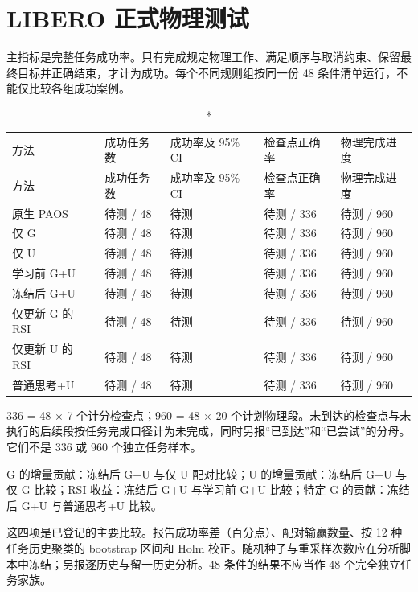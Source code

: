 \documentclass[UTF8,10pt,a4paper]{ctexart}
\begin{document}
\section*{LIBERO 正式物理测试}
主指标是完整任务成功率。只有完成规定物理工作、满足顺序与取消约束、保留最终目标并正确结束，才计为成功。每个不同规则组按同一份 48 条件清单运行，不能仅比较各组成功案例。
\begin{small}
\begin{longtable}{>{\raggedright\arraybackslash}p{3.73cm}>{\raggedright\arraybackslash}p{2.41cm}>{\raggedright\arraybackslash}p{3.51cm}>{\raggedright\arraybackslash}p{2.85cm}>{\raggedright\arraybackslash}p{2.63cm}}
\caption*{表 4 LIBERO 正式测试主结果预留表}\\
\toprule
方法 & 成功任务数 & 成功率及 95\% CI & 检查点正确率 & 物理完成进度\\\midrule
\endfirsthead
\toprule
方法 & 成功任务数 & 成功率及 95\% CI & 检查点正确率 & 物理完成进度\\\midrule
\endhead
原生 PAOS & 待测 / 48 & 待测 & 待测 / 336 & 待测 / 960\\
仅 G & 待测 / 48 & 待测 & 待测 / 336 & 待测 / 960\\
仅 U & 待测 / 48 & 待测 & 待测 / 336 & 待测 / 960\\
学习前 G+U & 待测 / 48 & 待测 & 待测 / 336 & 待测 / 960\\
冻结后 G+U & 待测 / 48 & 待测 & 待测 / 336 & 待测 / 960\\
仅更新 G 的 RSI & 待测 / 48 & 待测 & 待测 / 336 & 待测 / 960\\
仅更新 U 的 RSI & 待测 / 48 & 待测 & 待测 / 336 & 待测 / 960\\
普通思考+U & 待测 / 48 & 待测 & 待测 / 336 & 待测 / 960\\
\bottomrule
\end{longtable}
\end{small}
336 = 48 \ensuremath{\times} 7 个计分检查点；960 = 48 \ensuremath{\times} 20 个计划物理段。未到达的检查点与未执行的后续段按任务完成口径计为未完成，同时另报“已到达”和“已尝试”的分母。它们不是 336 或 960 个独立任务样本。

G 的增量贡献：冻结后 G+U 与仅 U 配对比较；U 的增量贡献：冻结后 G+U 与仅 G 比较；RSI 收益：冻结后 G+U 与学习前 G+U 比较；特定 G 的贡献：冻结后 G+U 与普通思考+U 比较。

这四项是已登记的主要比较。报告成功率差（百分点）、配对输赢数量、按 12 种任务历史聚类的 bootstrap 区间和 Holm 校正。随机种子与重采样次数应在分析脚本中冻结；另报逐历史与留一历史分析。48 条件的结果不应当作 48 个完全独立任务家族。
\end{document}

